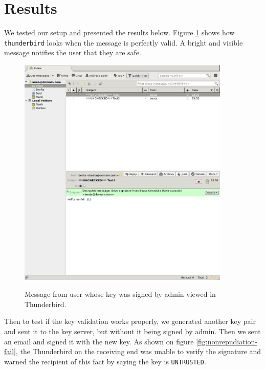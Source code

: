 \documentclass{classrep}
\newcommand\code[1]{\texttt{#1}}
\begin{document}
\section{Results}

We tested our setup and presented the results below. Figure \ref{fig:ok} shows how
\code{thunderbird} looks when the message is perfectly valid. A bright and visible
message notifies the user that they are safe.

\begin{figure}[H]
\centering
    \includegraphics[width=0.9\textwidth]{images/ok.png}
    \label{fig:ok}
    \caption{Message from user whose key was signed by admin viewed in Thunderbird.}
\end{figure}

Then to test if the key validation works properly, we generated another key pair and
sent it to the key server, but without it being signed by admin. Then we sent an email
and signed it with the new key. As shown on figure \ref{fig:nonrepudiation-fail},
the Thunderbird on the receiving end was unable to verify the signature and warned
the recipient of this fact by saying the key is \code{UNTRUSTED}.
\end{document}

